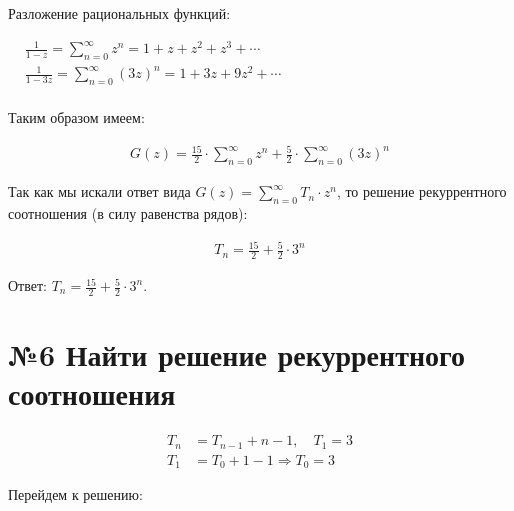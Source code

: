 \documentclass[a4paper,12pt,numbers=noenddot]{scrreprt}
\begin{document}
\begin{flushleft}
Разложение рациональных функций:
\end{flushleft}

$\begin{aligned}
& \frac{1}{1-z} = \sum_{n=0}^{\infty} z^n = 1 + z + z^2 + z^3 + \cdots \\&
\frac{1}{1-3z} = \sum_{n=0}^{\infty} (3z)^n = 1 + 3z + 9z^2 + \cdots \\&
\end{aligned}$

\begin{flushleft}
Таким образом имеем:
\end{flushleft}

\begin{align}
G(z) = \frac{15}{2} \cdot \sum_{n=0}^{\infty} z^n + \frac{5}{2} \cdot \sum_{n=0}^{\infty} (3z)^n
\end{align}

\begin{flushleft}
Так как мы искали ответ вида $G(z)=\sum_{n=0}^{\infty} T_n \cdot z^n$, то решение рекуррентного соотношения (в силу равенства рядов):
\end{flushleft}

\begin{align}
T_n = \frac{15}{2} + \frac{5}{2} \cdot 3^n
\end{align}

\begin{flushleft}
Ответ: $T_n = \frac{15}{2} + \frac{5}{2} \cdot 3^n$.
\end{flushleft}

\section{№6 Найти решение рекуррентного соотношения}

\begin{align}
    T_n &= T_{n-1} + n - 1, \quad T_1 = 3 \\
    T_1 &= T_0 + 1 - 1 \Rightarrow T_0 = 3
\end{align}

\begin{flushleft}
Перейдем к решению:
\end{flushleft}
\end{document}
